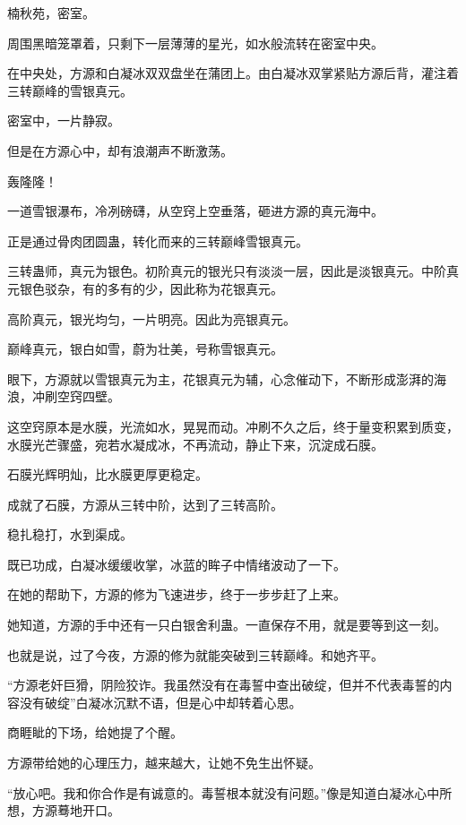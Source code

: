 
\begin{this_body}



楠秋苑，密室。

周围黑暗笼罩着，只剩下一层薄薄的星光，如水般流转在密室中央。

在中央处，方源和白凝冰双双盘坐在蒲团上。由白凝冰双掌紧贴方源后背，灌注着三转巅峰的雪银真元。

密室中，一片静寂。

但是在方源心中，却有浪潮声不断激荡。

轰隆隆！

一道雪银瀑布，冷冽磅礴，从空窍上空垂落，砸进方源的真元海中。

正是通过骨肉团圆蛊，转化而来的三转巅峰雪银真元。

三转蛊师，真元为银色。初阶真元的银光只有淡淡一层，因此是淡银真元。中阶真元银色驳杂，有的多有的少，因此称为花银真元。

高阶真元，银光均匀，一片明亮。因此为亮银真元。

巅峰真元，银白如雪，蔚为壮美，号称雪银真元。

眼下，方源就以雪银真元为主，花银真元为辅，心念催动下，不断形成澎湃的海浪，冲刷空窍四壁。

这空窍原本是水膜，光流如水，晃晃而动。冲刷不久之后，终于量变积累到质变，水膜光芒骤盛，宛若水凝成冰，不再流动，静止下来，沉淀成石膜。

石膜光辉明灿，比水膜更厚更稳定。

成就了石膜，方源从三转中阶，达到了三转高阶。

稳扎稳打，水到渠成。

既已功成，白凝冰缓缓收掌，冰蓝的眸子中情绪波动了一下。

在她的帮助下，方源的修为飞速进步，终于一步步赶了上来。

她知道，方源的手中还有一只白银舍利蛊。一直保存不用，就是要等到这一刻。

也就是说，过了今夜，方源的修为就能突破到三转巅峰。和她齐平。

“方源老奸巨猾，阴险狡诈。我虽然没有在毒誓中查出破绽，但并不代表毒誓的内容没有破绽”白凝冰沉默不语，但是心中却转着心思。

商睚眦的下场，给她提了个醒。

方源带给她的心理压力，越来越大，让她不免生出怀疑。

“放心吧。我和你合作是有诚意的。毒誓根本就没有问题。”像是知道白凝冰心中所想，方源蓦地开口。


\end{this_body}
